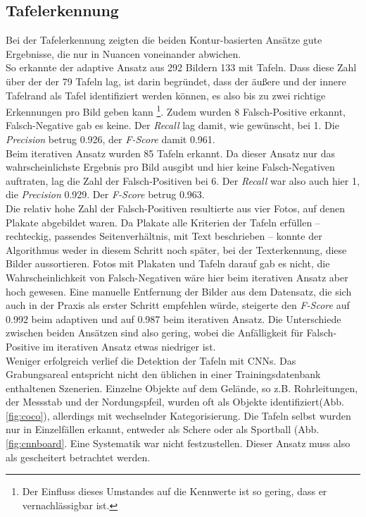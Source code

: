 \subsection{Tafelerkennung}
Bei der Tafelerkennung zeigten  die beiden Kontur-basierten Ansätze gute Ergebnisse, die nur in Nuancen voneinander abwichen.\\
So erkannte der adaptive Ansatz aus 292 Bildern 133 mit Tafeln. Dass diese Zahl über der der 79 Tafeln lag, ist darin begründet, dass der äußere und der innere Tafelrand als Tafel identifiziert werden können, es also bis zu zwei richtige Erkennungen pro Bild geben kann \footnote{Der Einfluss dieses Umstandes auf die Kennwerte ist so gering, dass er vernachlässigbar ist.}. Zudem wurden 8 Falsch-Positive erkannt, Falsch-Negative gab es keine. Der \textit{Recall} lag damit, wie gewünscht, bei 1. Die \textit{Precision} betrug 0.926, der \textit{F-Score} damit 0.961.\\
Beim iterativen Ansatz wurden 85 Tafeln erkannt. Da dieser Ansatz nur das wahrscheinlichste Ergebnis pro Bild ausgibt und hier keine Falsch-Negativen auftraten, lag die Zahl der Falsch-Positiven bei 6. Der \textit{Recall} war also auch hier 1, die \textit{Precision} 0.929. Der \textit{F-Score} betrug 0.963.\\
Die relativ hohe Zahl der Falsch-Positiven resultierte aus vier Fotos, auf denen Plakate abgebildet waren. Da Plakate alle Kriterien der Tafeln erfüllen -- rechteckig, passendes Seitenverhältnis, mit Text beschrieben -- konnte der Algorithmus weder in diesem Schritt noch später, bei der Texterkennung, diese Bilder aussortieren. Fotos mit Plakaten und Tafeln darauf gab es nicht, die Wahrscheinlichkeit von Falsch-Negativen wäre hier beim iterativen Ansatz aber hoch gewesen. Eine manuelle Entfernung der Bilder aus dem Datensatz, die sich auch in der Praxis als erster Schritt empfehlen würde, steigerte den \textit{F-Score} auf 0.992 beim adaptiven und auf 0.987 beim iterativen Ansatz. Die Unterschiede zwischen beiden Ansätzen sind also gering, wobei die Anfälligkeit für Falsch-Positive im iterativen Ansatz etwas niedriger ist. \\

Weniger erfolgreich verlief die Detektion der Tafeln mit CNNs. Das Grabungsareal entspricht nicht den üblichen in einer Trainingsdatenbank enthaltenen Szenerien. Einzelne Objekte auf dem Gelände, so z.B. Rohrleitungen, der Messstab und der Nordungspfeil, wurden oft als Objekte identifiziert(Abb.\ref{fig:coco}), allerdings mit wechselnder Kategorisierung. Die Tafeln selbst wurden nur in Einzelfällen erkannt, entweder als Schere oder als Sportball (Abb.\ref{fig:cnnboard}. Eine Systematik war nicht festzustellen. Dieser Ansatz muss also als gescheitert betrachtet werden.

